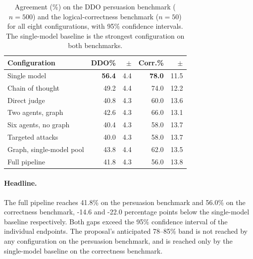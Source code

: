 \documentclass[11pt,twocolumn,letterpaper]{article}
\newcommand{\HumanTestTopics}{50}
\newcommand{\FullAccLo}{78}
\newcommand{\FullAccHi}{85}
\newcommand{\DDOSample}{500}
\newcommand{\DDOAccSingle}{56.4}
\newcommand{\DDOAccCoT}{49.2}
\newcommand{\DDOAccDirect}{40.8}
\newcommand{\DDOAccTwoAg}{42.6}
\newcommand{\DDOAccSixAg}{40.4}
\newcommand{\DDOAccTarg}{40.0}
\newcommand{\DDOAccDungNA}{43.8}
\newcommand{\DDOAccFull}{41.8}
\newcommand{\LogicAccSingle}{78.0}
\newcommand{\LogicAccCoT}{74.0}
\newcommand{\LogicAccDirect}{60.0}
\newcommand{\LogicAccTwoAg}{66.0}
\newcommand{\LogicAccSixAg}{58.0}
\newcommand{\LogicAccTarg}{58.0}
\newcommand{\LogicAccDungNA}{62.0}
\newcommand{\LogicAccFull}{56.0}
\newcommand{\DDOGap}{-14.6}
\newcommand{\LogicGap}{-22.0}
\begin{document}
\begin{table}[h]
\centering\small
\setlength{\tabcolsep}{3pt}
\begin{tabular}{lrrrr}
\toprule
\textbf{Configuration} & \textbf{DDO\%} & \textbf{$\pm$} &
  \textbf{Corr.\%} & \textbf{$\pm$} \\
\midrule
Single model                 & \textbf{\DDOAccSingle} & 4.4 &
                               \textbf{\LogicAccSingle} & 11.5 \\
Chain of thought             & \DDOAccCoT    & 4.4 &
                               \LogicAccCoT  & 12.2 \\
Direct judge                 & \DDOAccDirect & 4.3 &
                               \LogicAccDirect & 13.6 \\
Two agents, graph            & \DDOAccTwoAg  & 4.3 &
                               \LogicAccTwoAg  & 13.1 \\
Six agents, no graph         & \DDOAccSixAg  & 4.3 &
                               \LogicAccSixAg  & 13.7 \\
Targeted attacks             & \DDOAccTarg   & 4.3 &
                               \LogicAccTarg   & 13.7 \\
Graph, single-model pool     & \DDOAccDungNA & 4.4 &
                               \LogicAccDungNA & 13.5 \\
Full pipeline                & \DDOAccFull   & 4.3 &
                               \LogicAccFull   & 13.8 \\
\bottomrule
\end{tabular}
\caption{Agreement (\%) on the DDO persuasion benchmark
($n=\DDOSample$) and the logical-correctness benchmark
($n=\HumanTestTopics$) for all eight configurations, with 95\%
confidence intervals. The single-model baseline is the strongest
configuration on both benchmarks.}
\label{tab:results}
\end{table}

\paragraph{Headline.}
The full pipeline reaches \DDOAccFull\% on the persuasion benchmark
and \LogicAccFull\% on the correctness benchmark, \DDOGap{} and
\LogicGap{} percentage points below the single-model baseline
respectively. Both gaps exceed the 95\% confidence interval of the
individual endpoints. The proposal's anticipated
\FullAccLo--\FullAccHi\% band is not reached by any configuration on
the persuasion benchmark, and is reached only by the single-model
baseline on the correctness benchmark.
\end{document}

